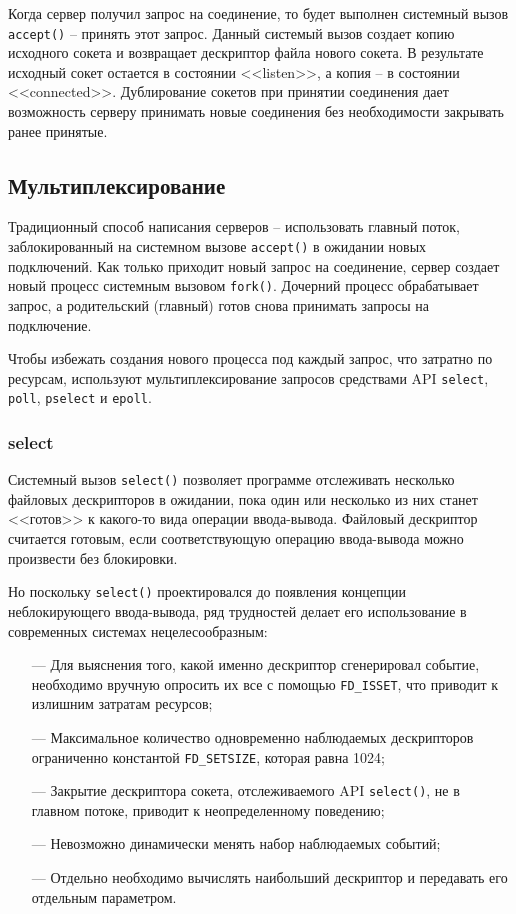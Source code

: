 Когда сервер получил запрос на соединение, то будет выполнен системный вызов \texttt{accept()} -- принять этот запрос. Данный системый вызов создает копию исходного сокета и возвращает дескриптор файла нового сокета. В результате исходный сокет остается в состоянии <<listen>>, а копия -- в состоянии <<connected>>. Дублирование сокетов при принятии соединения дает возможность серверу принимать новые соединения без необходимости закрывать ранее принятые.

\subsection{Мультиплексирование}

Традиционный способ написания серверов -- использовать главный поток, заблокированный на системном вызове \texttt{accept()} в ожидании новых подключений. Как только приходит новый запрос на соединение, сервер создает новый процесс системным вызовом \texttt{fork()}. Дочерний процесс обрабатывает запрос, а родительский (главный) готов снова принимать запросы на подключение.

Чтобы избежать создания нового процесса под каждый запрос, что затратно по ресурсам, используют мультиплексирование запросов средствами API \texttt{select}, \texttt{poll}, \texttt{pselect} и \texttt{epoll}.

\subsubsection{select}

Системный вызов \texttt{select()} позволяет программе отслеживать несколько файловых дескрипторов в ожидании, пока один или несколько из них станет <<готов>> к какого-то вида операции ввода-вывода. Файловый дескриптор считается готовым, если соответствующую операцию ввода-вывода можно произвести без блокировки.

Но поскольку \texttt{select()} проектировался до появления концепции неблокирующего ввода-вывода, ряд трудностей делает его использование в современных системах нецелесообразным:

\begin{itemize}
	\item[---] Для выяснения того, какой именно дескриптор сгенерировал событие, необходимо вручную опросить их все с помощью \texttt{FD\_ISSET}, что приводит к излишним затратам ресурсов;
	
	\item[---] Максимальное количество одновременно наблюдаемых дескрипторов ограниченно константой \texttt{FD\_SETSIZE}, которая равна 1024;
	
	\item[---] Закрытие дескриптора сокета, отслеживаемого API \texttt{select()}, не в главном потоке, приводит к неопределенному поведению;
	
	\item[---] Невозможно динамически менять набор наблюдаемых событий;
	
	\item[---] Отдельно необходимо вычислять наибольший дескриптор и передавать его отдельным параметром.
\end{itemize} 

